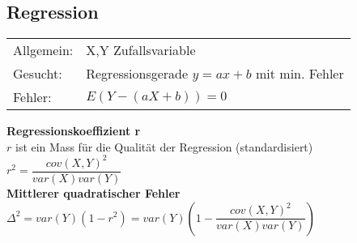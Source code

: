 \begin{minipage}[c]{9cm}
  \subsection{Regression }
  \begin{tabular}{ll}
    Allgemein: & X,Y Zufallsvariable \\
    Gesucht: & Regressionsgerade $y=ax+b$ mit min. Fehler \\
    Fehler: & $E(Y-(aX+b))=0$
  \end{tabular}
  \vspace{.1cm}
  \textbf{Regressionskoeffizient r} \\
  $r$ ist ein Mass für die Qualität der Regression (standardisiert) \\
  $r^2=\dfrac{cov(X,Y)^2}{var(X)var(Y)}$ \\
  \textbf{Mittlerer quadratischer Fehler} \\
  $\Delta^2 = var(Y)(1-r^2) =
  var(Y)\left(1-\dfrac{cov(X,Y)^2}{var(X)var(Y)}\right) $ \\
\end{minipage}
